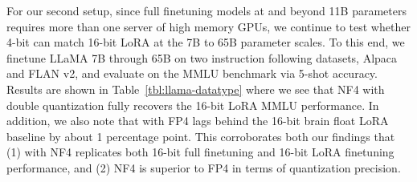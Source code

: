 For our second setup, since full finetuning models at and beyond 11B parameters requires more than one server of high memory GPUs, we continue to test whether 4-bit \method can match 16-bit LoRA at the 7B to 65B parameter scales. To this end, we finetune LLaMA 7B through 65B on two instruction following datasets, Alpaca and FLAN v2, and evaluate on the MMLU benchmark via 5-shot accuracy.
Results are shown in Table~\ref{tbl:llama-datatype} where we see that NF4 with double quantization fully recovers the 16-bit LoRA MMLU performance. In addition, we also note that \method with FP4 lags behind the 16-bit brain float LoRA baseline by about 1 percentage point. This corroborates both our findings that (1) \method with NF4 replicates both 16-bit full finetuning and 16-bit LoRA finetuning performance, and (2) NF4 is superior to FP4 in terms of quantization precision.
\begin{table}[]
    \centering
    \caption{Experiments comparing 16-bit BrainFloat (BF16), 8-bit Integer (Int8), 4-bit Float (FP4), and 4-bit NormalFloat (NF4) on GLUE and Super-NaturalInstructions. \method replicates 16-bit LoRA and full-finetuning.}
    
    \label{tab:nf4vsbf16}
\end{table}


